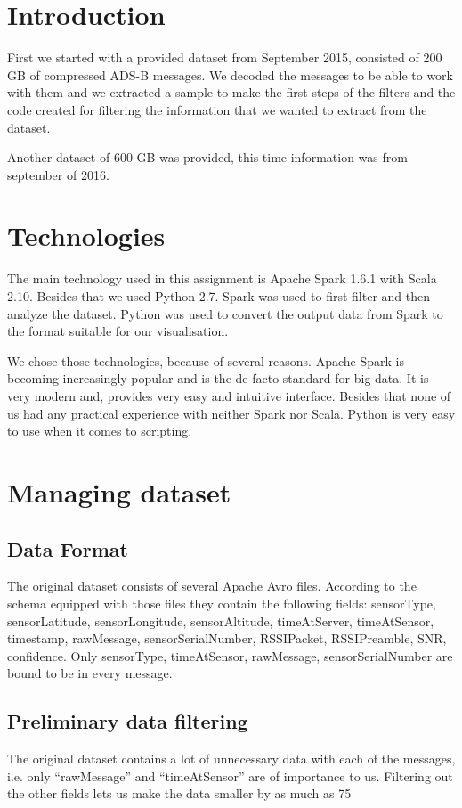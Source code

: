 \documentclass{vldb}
\begin{document}
\section{Introduction}
First we started with a provided dataset from September 2015, 
consisted of 200 GB of compressed ADS-B messages. 
We decoded the messages to be able to work with them 
and we extracted a sample to make the first steps of the filters 
and the code created for filtering the information that we wanted to extract from the dataset.

Another dataset of 600 GB was provided, this time information was from september of 2016.

\section{Technologies}
The main technology used in this assignment is Apache Spark 1.6.1 with Scala 2.10. 
Besides that we used Python 2.7. Spark was used to first filter and then analyze the dataset. 
Python was used to convert the output data from Spark to the format suitable for our visualisation.

We chose those technologies, because of several reasons. 
Apache Spark is becoming increasingly popular and is the de facto standard for big data. 
It is very modern and, provides very easy and intuitive interface. 
Besides that none of us had any practical experience with neither Spark nor Scala. 
Python is very easy to use when it comes to scripting.

\section{Managing dataset}
\subsection{Data Format}
The original dataset consists of several Apache Avro files. 
According to the schema equipped with those files they contain the following fields: sensorType, sensorLatitude, 
sensorLongitude, sensorAltitude, timeAtServer, timeAtSensor, timestamp, rawMessage, sensorSerialNumber, RSSIPacket, 
RSSIPreamble, SNR, confidence. Only sensorType, timeAtSensor, rawMessage, sensorSerialNumber are bound to be in every message.

\subsection{Preliminary data filtering}
The original dataset contains a lot of unnecessary data with each of the messages,
 i.e. only “rawMessage” and “timeAtSensor” are of importance to us. 
Filtering out the other fields lets us make the data smaller by as much as 75%
\end{document}
